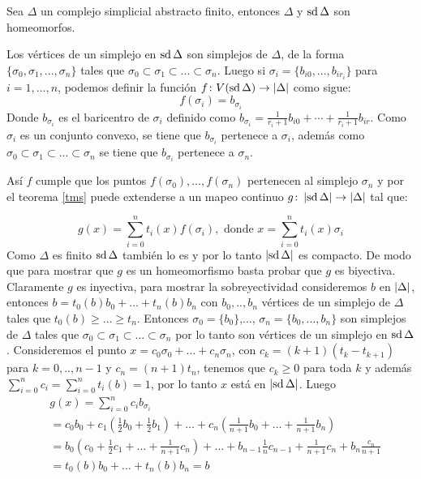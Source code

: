 \begin{Teo}
Sea $\Delta$ un complejo simplicial abstracto finito, entonces $\Delta$ y $\operatorname{sd}\Delta$ son homeomorfos.
\end{Teo}

\begin{Dem}
Los vértices de un simplejo en $\operatorname{sd}\Delta$ son simplejos de $\Delta$, de la forma $\{\sigma_0,\sigma_1,...,\sigma_n\}$ tales que $\sigma_0\subset \sigma_1\subset...\subset\sigma_n$.
Luego si $\sigma_i = \{b_{i0},...,b_{ir_i}\}$ para $i = 1,...,n$, podemos definir la función $f\colon V(\operatorname{sd}\Delta) \rightarrow \left| \Delta \right|$ como sigue:
\begin{equation*}
f(\sigma_{i})= b_{\sigma_{i}}
\end{equation*}
Donde $b_{\sigma_{i}}$ es el baricentro de $\sigma_{i}$ definido como $b_{\sigma_i} = \frac{1}{r_i+1}b_{i0}+\cdots+\frac{1}{r_i+1}b_{ir}$.
Como $\sigma_{i}$ es un conjunto convexo, se tiene que $b_{\sigma_{i}}$ pertenece a $\sigma_{i}$, además como $\sigma_0\subset \sigma_1\subset...\subset\sigma_n$ se tiene que $b_{\sigma_{i}}$ pertenece a $\sigma_{n}$.

Así $f$ cumple que los puntos $f(\sigma_0),\ldots,f(\sigma_n)$ pertenecen al simplejo $\sigma_{n}$ y por el teorema \ref{tms} puede extenderse a un mapeo continuo $g\colon \left| \operatorname{sd}\Delta \right|\rightarrow\left| \Delta \right|$ tal que:

\begin{equation*}
g(x)= \sum_{i=0}^{n}t_i(x)f(\sigma_i), \textrm{ donde }  x= \sum_{i=0}^{n}t_i(x)\sigma_i
\end{equation*}
Como $\Delta$ es finito $\operatorname{sd}\Delta$ también lo es y por lo tanto $\left| \operatorname{sd}\Delta \right|$ es compacto. De modo que para mostrar que $g$ es un homeomorfismo basta probar que $g$ es biyectiva.
Claramente $g$ es inyectiva, para mostrar la sobreyectividad consideremos $b$ en $\left| \Delta \right|$, entonces $b = t_0(b)b_0 +\dots +t_n(b)b_n$ con $b_0,..,b_n$ vértices de un simplejo de $\Delta$ tales que $t_0(b)\geq \dots\geq t_n$.
Entonces $\sigma_0 = \{b_0\}$,..., $\sigma_n = \{b_0,...,b_n\}$ son simplejos de $\Delta$ tales que $\sigma_0\subset \sigma_1\subset...\subset\sigma_n$ por lo tanto son vértices de un simplejo en $\operatorname{sd}\Delta$.
Consideremos el punto $x = c_0\sigma_0+\dots+c_n\sigma_n$, con $c_k = (k+1)(t_k-t_{k+1})$ para $k = 0,..,n-1$ y $c_n = (n+1)t_n$, tenemos que $c_k\geq 0$ para toda $k$ y además 
$\sum_{i= 0}^{n}c_i = \sum_{i = 0}^{n}t_i(b) = 1$, por lo tanto $x$ está en $\left| \operatorname{sd}\Delta \right|$.
Luego
\begin{align*}
&g(x) = \sum_{i = 0}^{n}c_ib_{\sigma_i}\\
&=c_0b_0 + c_1(\frac{1}{2}b_0 + \frac{1}{2}b_1)+\dots +c_n(\frac{1}{n+1}b_0+\dots +\frac{1}{n+1}b_n)\\
&= b_0(c_0+ \frac{1}{2}c_1+\dots + \frac{1}{n+1}c_n)+\dots +b_{n-1}{\frac{1}{n}c_{n-1}+\frac{1}{n+1}c_n} + b_n\frac{c_n}{n+1}\\
&= t_0(b)b_0+\dots +t_n(b)b_n = b
\end{align*}  
\end{Dem}

